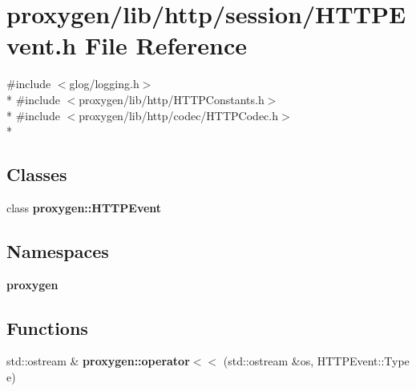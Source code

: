 \section{proxygen/lib/http/session/\+H\+T\+T\+P\+Event.h File Reference}
\label{HTTPEvent_8h}
{\ttfamily \#include $<$glog/logging.\+h$>$}\\*
{\ttfamily \#include $<$proxygen/lib/http/\+H\+T\+T\+P\+Constants.\+h$>$}\\*
{\ttfamily \#include $<$proxygen/lib/http/codec/\+H\+T\+T\+P\+Codec.\+h$>$}\\*
\subsection*{Classes}
\begin{DoxyCompactItemize}
\item 
class {\bf proxygen\+::\+H\+T\+T\+P\+Event}
\end{DoxyCompactItemize}
\subsection*{Namespaces}
\begin{DoxyCompactItemize}
\item 
 {\bf proxygen}
\end{DoxyCompactItemize}
\subsection*{Functions}
\begin{DoxyCompactItemize}
\item 
std\+::ostream \& {\bf proxygen\+::operator$<$$<$} (std\+::ostream \&os, H\+T\+T\+P\+Event\+::\+Type e)
\end{DoxyCompactItemize}
